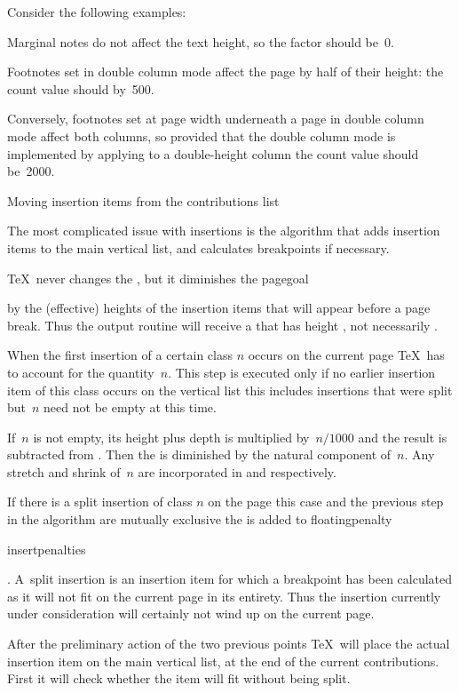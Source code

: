  Consider the following examples:
 \itemlist\item Marginal notes do not affect
 the text height, so the factor should be~0. \item Footnotes
 set in double column mode affect the page by half of their height:
 the count value should by~500. \item Conversely, footnotes
 set at page width underneath a page in double column mode
 affect both columns, so \ldash provided that the double column mode
 is implemented by applying  to a double-height column \rdash 
 the count value should be~2000.\itemliststop
\itemliststop

\point Moving insertion items from the contributions list

The most complicated issue with insertions is the algorithm
that adds insertion items to the main vertical list,
and calculates breakpoints if necessary.

\TeX\ never changes the , but it diminishes the
\csterm pagegoal\par
{} by the (effective) heights of the insertion
items that will appear before a page break. Thus the output
routine will receive a  that has height ,
not necessarily .

\enumerate
\item When the first insertion of a certain class $n$ occurs
  on the current page \TeX\ has to account for the quantity
  $\,n$. This step is executed only if no earlier
  insertion item of this class occurs on the vertical list
  \ldash this includes insertions that were split \rdash  but $\,n$
  need not be empty at this time.
  
  If $\,n$ is not empty, its height plus depth is multiplied
  by $\,n/1000$ and the result is subtracted
  from . Then the  is diminished
  by the natural component of $\,n$. Any stretch and
  shrink of $\,n$ are incorporated in 
  and  respectively.
\item If there is a split insertion of class $n$ on the page
  \ldash this case and the previous step in the algorithm are
  mutually exclusive \rdash  the  is added to
  \csterm floatingpenalty\par\csterm insertpenalties\par
  . A~split insertion is an insertion item
  for which a breakpoint has been calculated as it will not
  fit on the current page in its entirety. Thus the insertion
  currently under consideration will certainly not wind up 
  on the current page.
\item After the preliminary action of the two previous points
  \TeX\ will place the actual insertion item on the main vertical
  list, at the end of the current contributions.
  First it will check whether the item will fit without being split.
  

